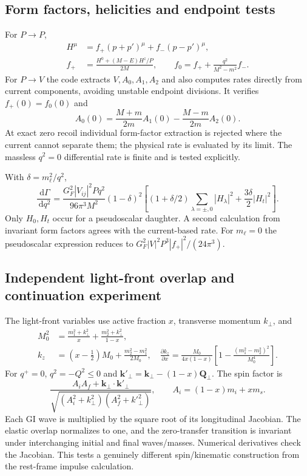 \documentclass[11pt,a4paper]{article}
\newcommand{\dd}{\,\mathrm d}
\begin{document}
\subsection{Form factors, helicities and endpoint tests}
For $P\to P$,
\begin{align}
 H^\mu&=f_+(p+p')^\mu+f_-(p-p')^\mu,\\
 f_+&=\frac{H^0+(M-E)H^z/P}{2M},\qquad
 f_0=f_++\frac{q^2}{M^2-m^2}f_- .
\end{align}
For $P\to V$ the code extracts $V,A_0,A_1,A_2$ and also computes rates directly from current components, avoiding unstable endpoint divisions. It verifies $f_+(0)=f_0(0)$ and
\begin{equation}
 A_0(0)=\frac{M+m}{2m}A_1(0)-\frac{M-m}{2m}A_2(0).
\end{equation}
At exact zero recoil individual form-factor extraction is rejected where the current cannot separate them; the physical rate is evaluated by its limit. The massless $q^2=0$ differential rate is finite and is tested explicitly.

With $\delta=m_\ell^2/q^2$,
\begin{equation}
 \frac{\dd\Gamma}{\dd q^2}=\frac{G_F^2|V_{ij}|^2Pq^2}{96\pi^3M^2}(1-\delta)^2
 \left[(1+\delta/2)\sum_{\lambda=\pm,0}|H_\lambda|^2+
 \frac{3\delta}{2}|H_t|^2\right].
\end{equation}
Only $H_0,H_t$ occur for a pseudoscalar daughter. A second calculation from invariant form factors agrees with the current-based rate. For $m_\ell=0$ the pseudoscalar expression reduces to $G_F^2|V|^2P^3|f_+|^2/(24\pi^3)$.

\subsection{Independent light-front overlap and continuation experiment}
The light-front variables use active fraction $x$, transverse momentum $k_\perp$, and
\begin{align}
 M_0^2&=\frac{m_1^2+k_\perp^2}{x}+\frac{m_2^2+k_\perp^2}{1-x},\\
 k_z&=(x-\tfrac12)M_0+\frac{m_2^2-m_1^2}{2M_0},\quad
 \frac{\partial k_z}{\partial x}=\frac{M_0}{4x(1-x)}
 \left[1-\frac{(m_1^2-m_2^2)^2}{M_0^4}\right].
\end{align}
For $q^+=0$, $q^2=-Q^2\leq0$ and $\mathbf k'_{\perp}=\mathbf k_\perp-(1-x)\mathbf Q_\perp$. The spin factor is
\begin{equation}
 \frac{A_iA_f+\mathbf k_\perp\cdot\mathbf k'_{\perp}}
 {\sqrt{(A_i^2+k_\perp^2)(A_f^2+k'^2_\perp)}},\qquad
 A_i=(1-x)m_i+xm_s.
\end{equation}
Each GI wave is multiplied by the square root of its longitudinal Jacobian. The elastic overlap normalizes to one, and the zero-transfer transition is invariant under interchanging initial and final waves/masses. Numerical derivatives check the Jacobian. This tests a genuinely different spin/kinematic construction from the rest-frame impulse calculation.
\end{document}
